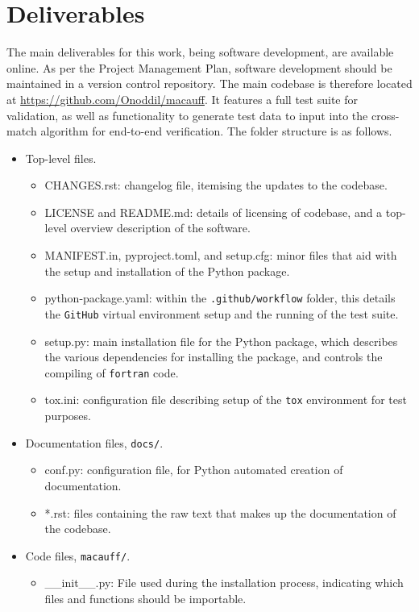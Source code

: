 \documentclass[a4paper,11pt]{scrartcl}
\begin{document}
\section{Deliverables}
The main deliverables for this work, being software development, are available online.
As per the Project Management Plan, software development should be maintained in a version control repository.
The main codebase is therefore located at \href{https://github.com/Onoddil/macauff/tree/7891efc9e5edc30febb2d3bcfdb14e97252493d0}{https://github.com/Onoddil/macauff}.
It features a full test suite for validation, as well as functionality to generate test data to input into the cross-match algorithm for end-to-end verification.
The folder structure is as follows.
\begin{itemize}
	\item Top-level files.
	\begin{itemize}
		\item CHANGES.rst: changelog file, itemising the updates to the codebase.
		\item LICENSE and README.md: details of licensing of codebase, and a top-level overview description of the software.
		\item MANIFEST.in, pyproject.toml, and setup.cfg: minor files that aid with the setup and installation of the Python package.
		\item python-package.yaml: within the \texttt{.github/workflow} folder, this details the \texttt{GitHub} virtual environment setup and the running of the test suite.
		\item setup.py: main installation file for the Python package, which describes the various dependencies for installing the package, and controls the compiling of \texttt{fortran} code.
		\item tox.ini: configuration file describing setup of the \texttt{tox} environment for test purposes.
	\end{itemize}
	\item Documentation files, \texttt{docs/}.
	\begin{itemize}
		\item conf.py: configuration file, for Python automated creation of documentation.
		\item *.rst: files containing the raw text that makes up the documentation of the codebase.
	\end{itemize}
	\item Code files, \texttt{macauff/}.
	\begin{itemize}
		\item \_\_init\_\_.py: File used during the installation process, indicating which files and functions should be importable.

\end{itemize}
\end{itemize}
\end{document}
